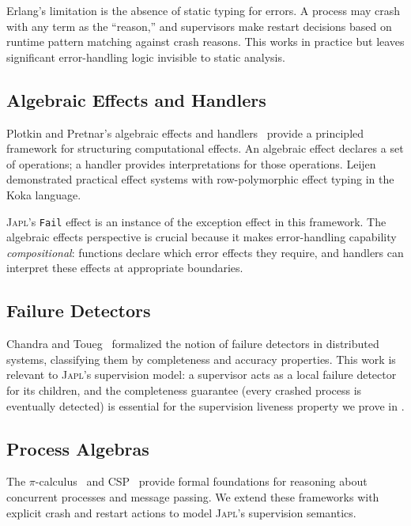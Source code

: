 \documentclass[11pt,twocolumn]{article}
\newcommand{\japl}{\textsc{Japl}}
\newcommand{\Fail}{\texttt{Fail}}
\begin{document}
Erlang's limitation is the absence of static typing for errors. A process may crash with any term as the ``reason,'' and supervisors make restart decisions based on runtime pattern matching against crash reasons. This works in practice but leaves significant error-handling logic invisible to static analysis.

\subsection{Algebraic Effects and Handlers}

Plotkin and Pretnar's algebraic effects and handlers~\cite{plotkin2009handlers,plotkin2013handling} provide a principled framework for structuring computational effects. An algebraic effect declares a set of operations; a handler provides interpretations for those operations. Leijen~\cite{leijen2017type} demonstrated practical effect systems with row-polymorphic effect typing in the Koka language.

\japl{}'s \Fail{} effect is an instance of the exception effect in this framework. The algebraic effects perspective is crucial because it makes error-handling capability \emph{compositional}: functions declare which error effects they require, and handlers can interpret these effects at appropriate boundaries.

\subsection{Failure Detectors}

Chandra and Toueg~\cite{chandra1996unreliable} formalized the notion of failure detectors in distributed systems, classifying them by completeness and accuracy properties. This work is relevant to \japl{}'s supervision model: a supervisor acts as a local failure detector for its children, and the completeness guarantee (every crashed process is eventually detected) is essential for the supervision liveness property we prove in .

\subsection{Process Algebras}

The $\pi$-calculus~\cite{milner1999communicating} and CSP~\cite{hoare1985communicating} provide formal foundations for reasoning about concurrent processes and message passing. We extend these frameworks with explicit crash and restart actions to model \japl{}'s supervision semantics.
\end{document}
